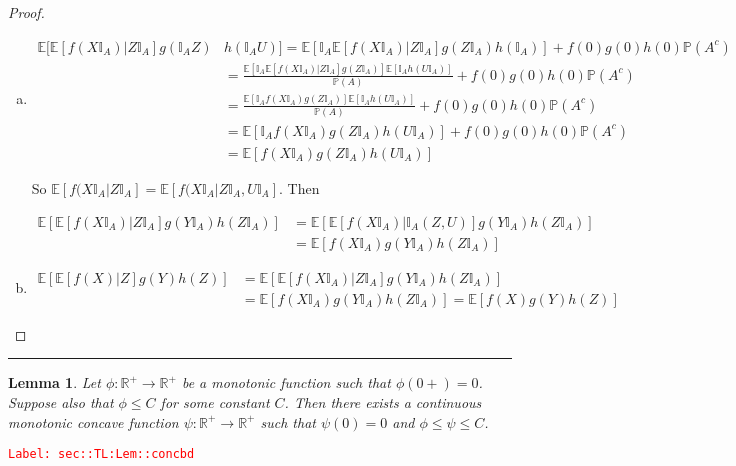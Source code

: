 \documentclass[12pt]{article}
\newcommand{\mb}{\mathbb}
\newcommand{\ra}{\rightarrow}
\newcommand{\tr}{\textcolor{red}}
\newcommand{\labe}[1]{\tr{\texttt{Label: #1}}}
\newcommand{\lin}{\rule{\linewidth}{0.4 pt}}
\newcommand{\pr}{\mb{P}}							%
\newcommand{\ex}[1]{\mb{E}\left[#1\right]}			%
\newcommand{\X}{X}								%
\newcommand{\XX}{Y}								%
\newcommand{\XXX}{Z}							%
\newcommand{\typset}{A}							%
\newtheorem{lem}[thms]{Lemma}
\begin{document}
\begin{proof}
\begin{enumerate}[(a)]
By linearity, this also holds for all bounded and measurable \(f,g\) and \(h\) with no restrictions on \(f(0),g(0),h(0)\), so the proof is complete.

\item 

\begin{align*}
\mb{E}\bigg[\ex{f(\X\mb{I}_\typset)| \XXX\mb{I}_\typset}g(\mb{I}_\typset\XXX)&h(\mb{I}_\typset U)\bigg] = \ex{\mb{I}_\typset\ex{f(\X\mb{I}_\typset)|\XXX\mb{I}_\typset}g(\XXX\mb{I}_\typset)h(\mb{I}_\typset)} + f(0)g(0)h(0)\pr(\typset^c)\\
&=\frac{\ex{\mb{I}_\typset\ex{f(\X\mb{I}_\typset)|\XXX\mb{I}_\typset}g(\XXX\mb{I}_\typset)}\ex{\mb{I}_\typset h(U\mb{I}_\typset)}}{\pr(\typset)} + f(0)g(0)h(0)\pr(\typset^c)\\
&=\frac{\ex{\mb{I}_\typset f(\X\mb{I}_\typset)g(\XXX\mb{I}_\typset)}\ex{\mb{I}_\typset h(U\mb{I}_\typset)}}{\pr(\typset)} + f(0)g(0)h(0)\pr(\typset^c)\\
&=\ex{\mb{I}_\typset f(\X\mb{I}_\typset)g(\XXX\mb{I}_\typset)h(U\mb{I}_\typset)} + f(0)g(0)h(0)\pr(\typset^c)\\
&= \ex{f(\X\mb{I}_\typset)g(\XXX\mb{I}_\typset)h(U\mb{I}_\typset)}
\end{align*}

So \(\ex{f(\X\mb{I}_\typset|\XXX\mb{I}_\typset} = \ex{f(\X\mb{I}_\typset|\XXX\mb{I}_\typset,U\mb{I}_\typset}\). Then 

\begin{align*}
\ex{\ex{f(\X\mb{I}_\typset)|\XXX\mb{I}_\typset}g(\XX\mb{I}_\typset)h(\XXX\mb{I}_\typset)} &= \ex{\ex{f(\X\mb{I}_\typset)|\mb{I}_\typset(\XXX,U)}g(\XX\mb{I}_\typset)h(\XXX\mb{I}_\typset)}\\
&=\ex{f(\X\mb{I}_\typset)g(\XX\mb{I}_\typset)h(\XXX\mb{I}_\typset)}
\end{align*}

\item 
\begin{align*}
\ex{\ex{f(\X)|\XXX}g(\XX)h(\XXX)} &= \ex{\ex{f(\X\mb{I}_\typset)|\XXX\mb{I}_\typset}g(\XX\mb{I}_\typset)h(\XXX\mb{I}_\typset)}\\
&= \ex{f(\X\mb{I}_\typset)g(\XX\mb{I}_\typset)h(\XXX\mb{I}_\typset)} = \ex{f(\X)g(\XX)h(\XXX)}
\end{align*}
\end{enumerate}
\end{proof}

\lin

\begin{lem}
Let \(\phi: \mb{R}^+ \ra \mb{R}^+\) be a monotonic function such that \(\phi(0+) = 0\). Suppose also that \(\phi \leq C\) for some constant \(C\). Then there exists a continuous monotonic concave function \(\psi:\mb{R}^+\ra \mb{R}^+\) such that \(\psi(0) = 0\) and \(\phi \leq \psi\leq C\).
\label{sec::TL:Lem::concbd}
\end{lem}
\labe{sec::TL:Lem::concbd}
\end{document}
